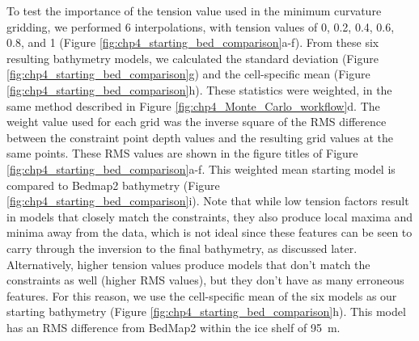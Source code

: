 To test the importance of the tension value used in the minimum curvature gridding, we performed 6 interpolations, with tension values of 0, 0.2, 0.4, 0.6, 0.8, and 1 (Figure \ref{fig:chp4_starting_bed_comparison}a-f). From these six resulting bathymetry models, we calculated the standard deviation (Figure \ref{fig:chp4_starting_bed_comparison}g) and the cell-specific mean (Figure \ref{fig:chp4_starting_bed_comparison}h). These statistics were weighted, in the same method described in Figure \ref{fig:chp4_Monte_Carlo_workflow}d. The weight value used for each grid was the inverse square of the RMS difference between the constraint point depth values and the resulting grid values at the same points. These RMS values are shown in the figure titles of Figure \ref{fig:chp4_starting_bed_comparison}a-f. This weighted mean starting model is compared to Bedmap2 bathymetry (Figure \ref{fig:chp4_starting_bed_comparison}i). Note that while low tension factors result in models that closely match the constraints, they also produce local maxima and minima away from the data, which is not ideal since these features can be seen to carry through the inversion to the final bathymetry, as discussed later. Alternatively, higher tension values produce models that don't match the constraints as well (higher RMS values), but they don't have as many erroneous features. For this reason, we use the cell-specific mean of the six models as our starting bathymetry (Figure \ref{fig:chp4_starting_bed_comparison}h). This model has an RMS difference from BedMap2 within the ice shelf of 95~m.\\

